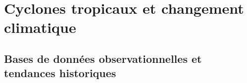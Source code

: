 \documentclass[../main.tex]{subfiles}
\begin{document}
% 
% 
% 
% 

\section{Cyclones tropicaux et changement climatique}

\subsection{Bases de données observationnelles et tendances historiques}\label{sec:observations}
\end{document}
